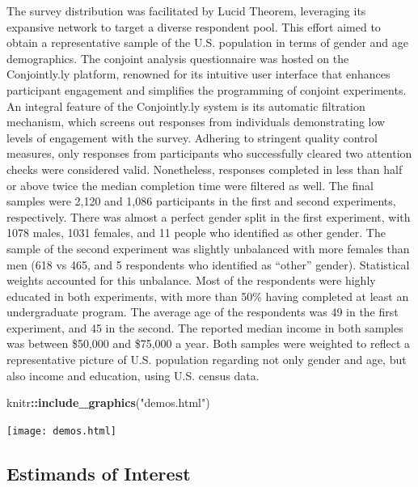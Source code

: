 \documentclass[
  12pt,
]{article}
\newenvironment{Shaded}{\begin{snugshade}}{\end{snugshade}}
\newcommand{\FunctionTok}[1]{\textcolor[rgb]{0.13,0.29,0.53}{\textbf{#1}}}
\newcommand{\NormalTok}[1]{#1}
\newcommand{\SpecialCharTok}[1]{\textcolor[rgb]{0.81,0.36,0.00}{\textbf{#1}}}
\newcommand{\StringTok}[1]{\textcolor[rgb]{0.31,0.60,0.02}{#1}}
\begin{document}
The survey distribution was facilitated by Lucid Theorem, leveraging its expansive network to target a diverse respondent pool. This effort aimed to obtain a representative sample of the U.S. population in terms of gender and age demographics. The conjoint analysis questionnaire was hosted on the Conjointly.ly platform, renowned for its intuitive user interface that enhances participant engagement and simplifies the programming of conjoint experiments. An integral feature of the Conjointly.ly system is its automatic filtration mechanism, which screens out responses from individuals demonstrating low levels of engagement with the survey. Adhering to stringent quality control measures, only responses from participants who successfully cleared two attention checks were considered valid. Nonetheless, responses completed in less than half or above twice the median completion time were filtered as well. The final samples were 2,120 and 1,086 participants in the first and second experiments, respectively. There was almost a perfect gender split in the first experiment, with 1078 males, 1031 females, and 11 people who identified as other gender. The sample of the second experiment was slightly unbalanced with more females than men (618 vs 465, and 5 respondents who identified as ``other'' gender). Statistical weights accounted for this unbalance. Most of the respondents were highly educated in both experiments, with more than 50\% having completed at least an undergraduate program. The average age of the respondents was 49 in the first experiment, and 45 in the second. The reported median income in both samples was between \$50,000 and \$75,000 a year. Both samples were weighted to reflect a representative picture of U.S. population regarding not only gender and age, but also income and education, using U.S. census data.

\begin{Shaded}
\begin{Highlighting}[]
\NormalTok{knitr}\SpecialCharTok{::}\FunctionTok{include\_graphics}\NormalTok{(}\StringTok{"demos.html"}\NormalTok{)}
\end{Highlighting}
\end{Shaded}

\texttt{[image: demos.html]}

\hypertarget{estimands-of-interest}{%
\subsection{Estimands of Interest}\label{estimands-of-interest}}
\end{document}
